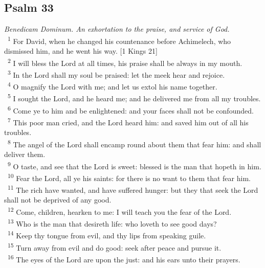 \documentclass[a5paper,12pt]{article}
\begin{document}
\begin{multicols*}{2}
\section{Psalm 33}
\label{sec:org53c6686}
\emph{Benedicam Dominum. An exhortation to the praise, and service of God.}\\

~\textsuperscript{1} For David, when he changed his countenance before Achimelech, who dismissed him, and he went his way. [1 Kings 21]\\
~\textsuperscript{2} I will bless the Lord at all times, his praise shall be always in my mouth.\\
~\textsuperscript{3} In the Lord shall my soul be praised: let the meek hear and rejoice.\\
~\textsuperscript{4} O magnify the Lord with me; and let us extol his name together.\\
~\textsuperscript{5} I sought the Lord, and he heard me; and he delivered me from all my troubles.\\
~\textsuperscript{6} Come ye to him and be enlightened: and your faces shall not be confounded.\\
~\textsuperscript{7} This poor man cried, and the Lord heard him: and saved him out of all his troubles.\\
~\textsuperscript{8} The angel of the Lord shall encamp round about them that fear him: and shall deliver them.\\
~\textsuperscript{9} O taste, and see that the Lord is sweet: blessed is the man that hopeth in him.\\
~\textsuperscript{10} Fear the Lord, all ye his saints: for there is no want to them that fear him.\\
~\textsuperscript{11} The rich have wanted, and have suffered hunger: but they that seek the Lord shall not be deprived of any good.\\
~\textsuperscript{12} Come, children, hearken to me: I will teach you the fear of the Lord.\\
~\textsuperscript{13} Who is the man that desireth life: who loveth to see good days?\\
~\textsuperscript{14} Keep thy tongue from evil, and thy lips from speaking guile.\\
~\textsuperscript{15} Turn away from evil and do good: seek after peace and pursue it.\\
~\textsuperscript{16} The eyes of the Lord are upon the just: and his ears unto their prayers.\\

\end{multicols*}
\end{document}
